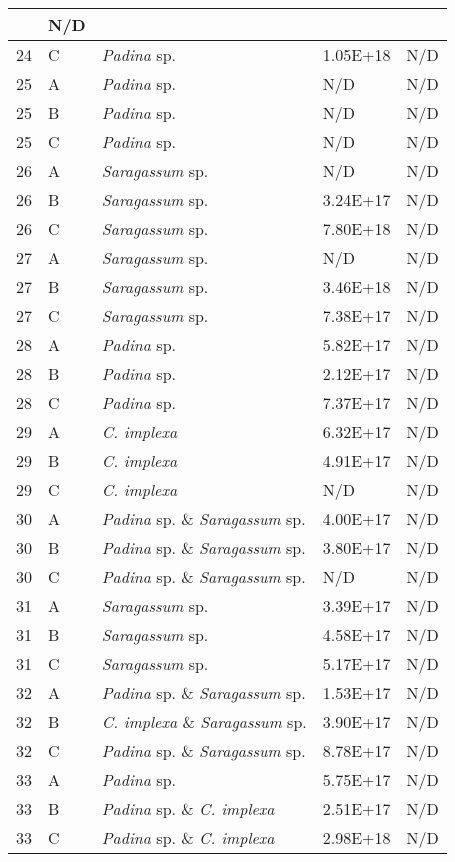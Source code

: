 \documentclass[12pt]{article}
\begin{document}
\begin{longtable}{ | p{1cm} | p{1cm} | p{3cm} | p{4cm} | p{4cm} | }
&N/D\\
\hline
24&C&\emph{Padina} sp.&1.05E+18
&N/D\\
\hline
25&A&\emph{Padina} sp.&N/D&N/D\\
\hline
25&B&\emph{Padina} sp.&N/D&N/D\\
\hline
25&C&\emph{Padina} sp.&N/D&N/D\\
\hline
26&A&\emph{Saragassum} sp.&N/D&N/D\\
\hline
26&B&\emph{Saragassum} sp.&3.24E+17
&N/D\\
\hline
26&C&\emph{Saragassum} sp.&7.80E+18
&N/D\\
\hline
27&A&\emph{Saragassum} sp.&N/D&N/D\\
\hline
27&B&\emph{Saragassum} sp.&3.46E+18
&N/D\\
\hline
27&C&\emph{Saragassum} sp.&7.38E+17
&N/D\\
\hline
28&A&\emph{Padina} sp.&5.82E+17
&N/D\\
\hline
28&B&\emph{Padina} sp.&2.12E+17
&N/D\\
\hline
28&C&\emph{Padina} sp.&7.37E+17
&N/D\\
\hline
29&A&\emph{C. implexa}&6.32E+17
&N/D\\
\hline
29&B&\emph{C. implexa}&4.91E+17
&N/D\\
\hline
29&C&\emph{C. implexa}&N/D&N/D\\
\hline
30&A&\emph{Padina} sp. \& \emph{Saragassum} sp.&4.00E+17
&N/D\\
\hline
30&B&\emph{Padina} sp. \& \emph{Saragassum} sp.&3.80E+17
&N/D\\
\hline
30&C&\emph{Padina} sp. \& \emph{Saragassum} sp.&N/D&N/D\\
\hline
31&A&\emph{Saragassum} sp.&3.39E+17
&N/D\\
\hline
31&B&\emph{Saragassum} sp.&4.58E+17
&N/D\\
\hline
31&C&\emph{Saragassum} sp.&5.17E+17
&N/D\\
\hline
32&A&\emph{Padina} sp. \& \emph{Saragassum} sp.&1.53E+17
&N/D\\
\hline
32&B&\emph{C. implexa} \& \emph{Saragassum} sp.&3.90E+17
&N/D\\
\hline
32&C&\emph{Padina} sp. \& \emph{Saragassum} sp.&8.78E+17
&N/D\\
\hline
33&A&\emph{Padina} sp.&5.75E+17
&N/D\\
\hline
33&B&\emph{Padina} sp. \& \emph{C. implexa}&2.51E+17
&N/D\\
\hline
33&C&\emph{Padina} sp. \& \emph{C. implexa}&2.98E+18
&N/D\\
\hline
\end{longtable}
\end{document}

